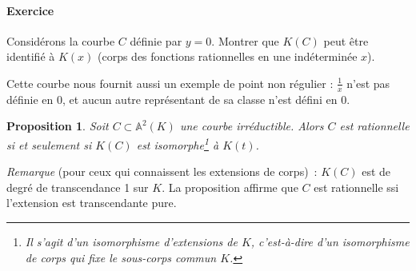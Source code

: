 \documentclass[a4paper, 11pt]{article}
\newtheorem{proposition}[théorème]{Proposition}
\theoremstyle{definition}
\newcommand{\aff}{\mathbb{A}}
\begin{document}
\paragraph{Exercice}
Considérons la courbe $C$ définie par $y = 0$.
Montrer que $K(C)$ peut être identifié à $K(x)$ (corps des fonctions
rationnelles en une indéterminée $x$).

Cette courbe nous fournit aussi un exemple de point non régulier :
$\frac{1}{x}$ n'est pas définie en $0$, et aucun autre représentant de
sa classe n'est défini en $0$.

\begin{proposition}
  Soit $C \subset \aff^2(K)$ une courbe irréductible. Alors $C$ est
  rationnelle si et seulement si $K(C)$ est isomorphe\footnote{Il
    s'agit d'un isomorphisme d'extensions de $K$, c'est-à-dire d'un
    isomorphisme de corps qui fixe le sous-corps commun $K$.} à
  $K(t)$.
\end{proposition}
\textit{Remarque} (pour ceux qui connaissent les extensions de
corps)~: $K(C)$ est de degré de transcendance 1 sur $K$. La
proposition affirme que $C$ est rationnelle ssi l'extension est
transcendante pure.
\end{document}
